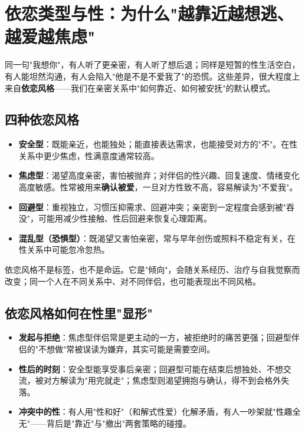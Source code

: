 \section{依恋类型与性：为什么"越靠近越想逃、越爱越焦虑"}

同一句"我想你"，有人听了更亲密，有人听了想后退；同样是短暂的性生活空白，有人能坦然沟通，有人会陷入"他是不是不爱我了"的恐慌。这些差异，很大程度上来自\textbf{依恋风格}——我们在亲密关系中"如何靠近、如何被安抚"的默认模式。

\subsection{四种依恋风格}

\begin{itemize}
	\item \textbf{安全型}：既能亲近，也能独处；能直接表达需求，也能接受对方的"不"。在性关系中更少焦虑，性满意度通常较高。
	\item \textbf{焦虑型}：渴望高度亲密，害怕被抛弃；对伴侣的性兴趣、回复速度、情绪变化高度敏感。性常被用来\textbf{确认被爱}，一旦对方性致不高，容易解读为"不爱我"。
	\item \textbf{回避型}：重视独立，习惯压抑需求、回避冲突；亲密到一定程度会感到被"吞没"，可能用减少性接触、性后回避来恢复心理距离。
	\item \textbf{混乱型（恐惧型）}：既渴望又害怕亲密，常与早年创伤或照料不稳定有关，在性关系中可能忽冷忽热。
\end{itemize}

\begin{tcolorbox}[colback=blue!5!white,colframe=blue!50!black,title=补充说明]
依恋风格不是标签，也不是命运。它是"倾向"，会随关系经历、治疗与自我觉察而改变；同一个人在不同关系中、对不同伴侣，也可能表现出不同风格。
\end{tcolorbox}

\subsection{依恋风格如何在性里"显形"}

\begin{itemize}
	\item \textbf{发起与拒绝}：焦虑型伴侣常是更主动的一方，被拒绝时的痛苦更强；回避型伴侣的"不想做"常被误读为嫌弃，其实可能是需要空间。
	\item \textbf{性后的时刻}：安全型能享受事后亲密；回避型可能在结束后想独处、不想交流，被对方解读为"用完就走"；焦虑型则渴望拥抱与确认，得不到会格外失落。
	\item \textbf{冲突中的性}：有人用"性和好"（和解式性爱）化解矛盾，有人一吵架就"性趣全无"——背后是"靠近"与"撤出"两套策略的碰撞。
\end{itemize}

